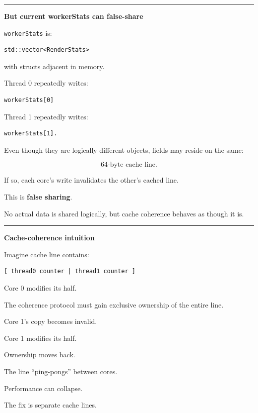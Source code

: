 \begin{center}\rule{0.5\linewidth}{0.5pt}\end{center}

\textbf{But current workerStats can false-share}

\texttt{workerStats} is:

\begin{verbatim}
std::vector<RenderStats>
\end{verbatim}

with structs adjacent in memory.

Thread 0 repeatedly writes:

\begin{verbatim}
workerStats[0]
\end{verbatim}

Thread 1 repeatedly writes:

\begin{verbatim}
workerStats[1].
\end{verbatim}

Even though they are logically different objects, fields may reside on the same:

\[
64\text{-byte cache line}.
\]

If so, each core's write invalidates the other's cached line.

This is \textbf{false sharing}.

No actual data is shared logically, but cache coherence behaves as though it is.

\begin{center}\rule{0.5\linewidth}{0.5pt}\end{center}

\textbf{Cache-coherence intuition}

Imagine cache line contains:

\begin{verbatim}
[ thread0 counter | thread1 counter ]
\end{verbatim}

Core 0 modifies its half.

The coherence protocol must gain exclusive ownership of the entire line.

Core 1's copy becomes invalid.

Core 1 modifies its half.

Ownership moves back.

The line ``ping-pongs'' between cores.

Performance can collapse.

The fix is separate cache lines.

